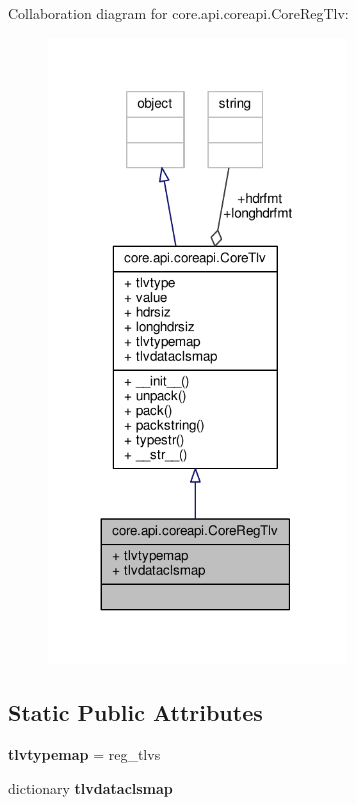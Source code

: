 Collaboration diagram for core.\+api.\+coreapi.\+Core\+Reg\+Tlv\+:
\nopagebreak
\begin{figure}[H]
\begin{center}
\leavevmode
\includegraphics[width=224pt]{classcore_1_1api_1_1coreapi_1_1_core_reg_tlv__coll__graph}
\end{center}
\end{figure}
\subsection*{Static Public Attributes}
\begin{DoxyCompactItemize}
\item 
\hypertarget{classcore_1_1api_1_1coreapi_1_1_core_reg_tlv_a815135856144d812c89d2483ebd3cec3}{{\bfseries tlvtypemap} = reg\+\_\+tlvs}\label{classcore_1_1api_1_1coreapi_1_1_core_reg_tlv_a815135856144d812c89d2483ebd3cec3}

\item 
dictionary {\bfseries tlvdataclsmap}
\end{DoxyCompactItemize}
